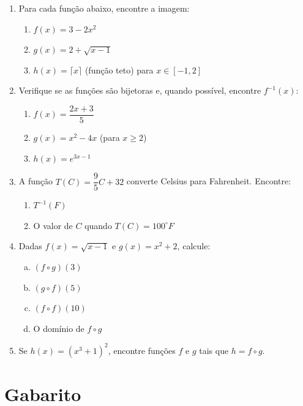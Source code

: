 \documentclass[12pt,a4paper]{article}
\begin{document}
\begin{enumerate}
\item Para cada função abaixo, encontre a imagem:
\begin{enumerate}
    \item $f(x) = 3 - 2x^2$
    \item $g(x) = 2 + \sqrt{x - 1}$
    \item $h(x) = \lceil x \rceil$ (função teto) para $x \in [-1, 2]$
\end{enumerate}



\item Verifique se as funções são bijetoras e, quando possível, encontre $f^{-1}(x)$:
\begin{enumerate}
    \item $f(x) = \dfrac{2x + 3}{5}$
    \item $g(x) = x^2 - 4x$ (para $x \geq 2$)
    \item $h(x) = e^{3x-1}$
\end{enumerate}

\item A função $T(C) = \dfrac{9}{5}C + 32$ converte Celsius para Fahrenheit. Encontre:
\begin{enumerate}
    \item $T^{-1}(F)$
    \item O valor de $C$ quando $T(C) = 100^\circ F$
\end{enumerate}


\item Dadas $f(x) = \sqrt{x-1}$ e $g(x) = x^2 + 2$, calcule:

\begin{enumerate}[a)]
    \item $(f \circ g)(3)$
    \item $(g \circ f)(5)$
    \item $(f \circ f)(10)$
    \item O domínio de $f \circ g$
\end{enumerate}

\item Se $h(x) = (x^3 + 1)^2$, encontre funções $f$ e $g$ tais que $h = f \circ g$.

\end{enumerate}

\section*{Gabarito}
\end{document}
